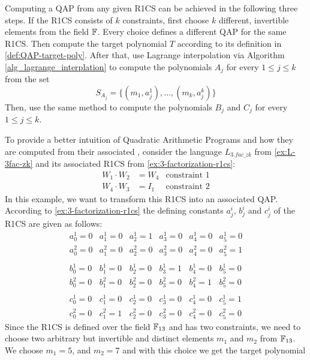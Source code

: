 Computing a QAP from any given R1CS can be achieved in the following three steps. If the R1CS consists of $k$ constraints, first choose $k$ different, invertible elements from the field $\mathbb{F}$. Every choice defines a different QAP for the same R1CS. Then compute the target polynomial $T$ according to its definition in \ref{def:QAP-target-poly}. After that, use Lagrange interpolation via Algorithm \ref{alg_lagrange_interplation} to compute the polynomials $A_j$ for every $1\leq j \leq k$ from the set 
\begin{equation}
S_{A_j} = \{(m_1,a^1_j),\ldots,(m_k,a^k_j)\}
\end{equation}
Then, use the same method to compute the polynomials $B_j$ and $C_j$ for every $1\leq j \leq k$. 
\begin{example}[3-factorization]
\label{ex:3-fac-QAP}  To provide a better intuition of Quadratic Arithmetic Programs and how they are computed from their associated , consider the language $L_{3.fac\_zk}$ from \examplename{} \ref{ex:L-3fac-zk} and its associated R1CS from \examplename{} \ref{ex:3-factorization-r1cs}:
\begin{align*}
W_1 \cdot W_2 & = W_4 & \text{constraint } 1\\
W_4 \cdot W_3 & = I_1 & \text{constraint } 2
\end{align*}
In this example, we want to transform this R1CS into an associated QAP. According to \examplename{} \ref{ex:3-factorization-r1cs} the defining constants $a_j^i$, $b_j^i$ and $c_j^i$ of the R1CS are given as follows:
$$
\begin{array}{llllll}
a_0^1 = 0 & a_1^1= 0 & a_2^1= 1 & a_3^1 = 0 & a_4^1= 0  & a_5^1= 0 \\ 
a_0^2 = 0 & a_1^2= 0 & a_2^2= 0 & a_3^2 = 0 & a_4^2= 0  & a_5^2= 1 \\ 
\\
b_0^1 = 0 & b_1^1= 0 & b_2^1= 0 & b_3^1 = 1 & b_4^1= 0  & b_5^1= 0 \\ 
b_0^2 = 0 & b_1^2= 0 & b_2^2= 0 & b_3^2 = 0 & b_4^2= 1  & b_5^2= 0 \\ 
\\
c_0^1 = 0 & c_1^1= 0 & c_2^1= 0 & c_3^1 = 0 & c_4^1= 0  & c_5^1= 1 \\ 
c_0^2 = 0 & c_1^2= 1 & c_2^2= 0 & c_3^2 = 0 & c_4^2= 0  & c_5^2= 0 
\end{array} 
$$
Since the R1CS is defined over the field $\mathbb{F}_{13}$ and has two constraints, we need to choose two arbitrary but invertible and distinct elements $m_1$ and $m_2$ from $\mathbb{F}_{13}$. We choose $m_{1}=5$, and $m_{2}=7$ and with this choice we get the target polynomial

\end{example}
